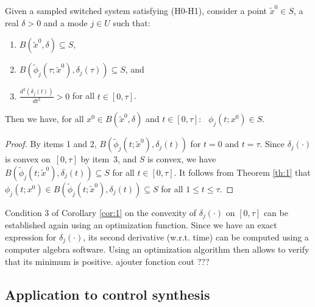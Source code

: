 \begin{corollary}\label{cor:1}

Given a sampled switched system %
satisfying (H0-H1), consider
a point $\tilde{x}^0\in S$, a real $\delta>0$ and a mode $j\in U$ such that:
\begin{enumerate}
\item $B(\tilde{x}^0,\delta)\subseteq S$,
\item $B(\tilde{\phi}_j(\tau;\tilde{x}^0),\delta_j(\tau))\subseteq S$, and
\item $\frac{d^2(\delta_j(t))}{dt^2}>0$ for all $t\in [0,\tau]$.
\end{enumerate}
Then we have, for all $x^0\in B(\tilde{x}^0,\delta)$ and $t\in[0,\tau]$:\ 
%
$\phi_j(t;x^0)\in S$.


\end{corollary}

\begin{proof}
By items 1 and 2, 
$B(\tilde{\phi}_j(t;\tilde{x}^0),\delta_j(t))$ for $t=0$ and $t=\tau$.
Since $\delta_j(\cdot)$ is convex on~$[0,\tau]$ by item~3, and $S$ is convex,
we have $B(\tilde{\phi}_j(t;\tilde{x}^0),\delta_j(t))\subseteq S$
for all $t\in[0,\tau]$. It follows from Theorem \ref{th:1}
that $\phi_j(t;x^0)\in B(\tilde{\phi}_j(t;\tilde{x}^0),\delta_j(t))\subseteq S$
for all $1\leq t\leq\tau$.
\end{proof}

\vspace{1em}

\begin{remark}
Condition 3 of Corollary \ref{cor:1} on the convexity of $\delta_j(\cdot)$ 
on $[0,\tau]$ can be established again using an optimization function.
Since we have an exact expression for $\delta_j(\cdot)$,
its second derivative (w.r.t. time) can be computed using a computer algebra software.
Using an optimization algorithm then allows to verify that 
its minimum is positive.
{ \todo ajouter fonction cout ???}

\end{remark}


\subsection{Application to control synthesis}\label{sec:appl}

